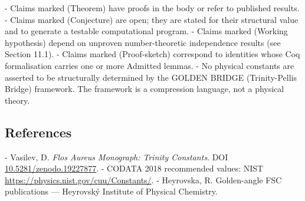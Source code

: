   - Claims marked (Theorem) have proofs in the body or refer to published results.
  - Claims marked (Conjecture) are open; they are stated for their structural value and to
  generate a testable computational program.
  - Claims marked (Working hypothesis) depend on unproven number-theoretic
  independence results (see Section 11.1).
  - Claims marked (Proof-sketch) correspond to identities whose Coq formalisation
  carries one or more Admitted lemmas.
  - No physical constants are asserted to be structurally determined by the GOLDEN BRIDGE (Trinity-Pellis Bridge)
  framework. The framework is a compression language, not a physical theory.

\subsection{References}

- Vasilev, D. \textit{Flos Aureus Monograph: Trinity Constants}. DOI \href{https://zenodo.org/doi/10.5281/zenodo.19227877}{10.5281/zenodo.19227877}.
- CODATA 2018 recommended values: NIST \href{https://physics.nist.gov/cuu/Constants/}{https://physics.nist.gov/cuu/Constants/}.
- Heyrovska, R. Golden-angle FSC publications --- Heyrovský Institute of Physical Chemistry.
